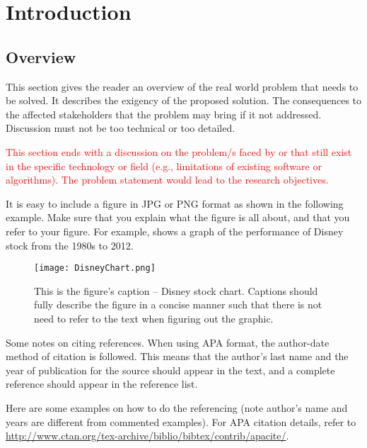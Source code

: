\chapter{Introduction}
\label{sec:researchdesc}    %

\section{Overview}
\label{sec:overview}

This section gives the reader an overview of the real world problem that needs to be solved. It describes the exigency of the proposed solution. The consequences to the affected stakeholders that the problem may bring if it not addressed. Discussion must not be too technical or too detailed.
   
\textcolor{red}{This section ends with a discussion on the problem/s faced by or that still exist in the specific
technology or field (e.g., limitations of existing software or algorithms). 
The problem statement would lead to the research objectives.}


It is   easy to include a figure in JPG or PNG format as shown in the  following example.  
Make sure that you explain what the figure is all about, and that you refer to your figure.  
For example,  shows a graph of the performance of Disney stock from the 1980s to 2012.
  
\begin{figure}[t]                %
   \centering                    %
   \texttt{[image: DisneyChart.png]}      %
   \caption{This is the figure's caption -- Disney stock chart.
   	Captions should fully describe the figure in a concise manner  such that there is not need to refer to the text when figuring out the graphic.}
    \label{fig:disneystock}
\end{figure}


Some notes on citing references.   
When using APA format, the author-date method of citation is  followed.   
This means that the author's last name and the year of publication for the source should  appear in the text, and a complete reference should appear in the reference list.


Here are some examples on how to do the referencing (note author's name and years are different from commented examples).  
For APA citation details, refer to \url{http://www.ctan.org/tex-archive/biblio/bibtex/contrib/apacite/}. 

